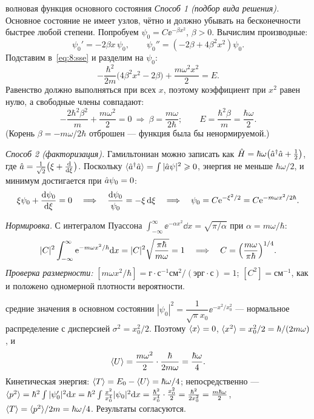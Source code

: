 \begin{derivation}[label=der:8:ground]{волновая функция основного состояния}
\emph{Способ 1 (подбор вида решения).} Основное состояние не имеет узлов, чётно и должно убывать
на бесконечности быстрее любой степени. Попробуем $\psi_0=C\ee^{-\beta x^2}$, $\beta>0$. Вычислим
производные:
\[
  \psi_0'=-2\beta x\,\psi_0,\qquad \psi_0''=(-2\beta+4\beta^2x^2)\psi_0 .
\]
Подставим в~\eqref{eq:8:sse} и разделим на $\psi_0$:
\[
  -\frac{\hbar^2}{2m}\bigl(4\beta^2x^2-2\beta\bigr)+\frac{m\omega^2x^2}{2}=E .
\]
Равенство должно выполняться при всех $x$, поэтому коэффициент при $x^2$ равен нулю, а
свободные члены совпадают:
\[
  -\frac{2\hbar^2\beta^2}{m}+\frac{m\omega^2}{2}=0\ \Rightarrow\ \beta=\frac{m\omega}{2\hbar};\qquad
  E=\frac{\hbar^2\beta}{m}=\frac{\hbar\omega}{2}.
\]
(Корень $\beta=-m\omega/2\hbar$ отброшен — функция была бы ненормируемой.)

\emph{Способ 2 (факторизация).} Гамильтониан можно записать как
$\hat{H}=\hbar\omega\bigl(\hat{a}^\dagger\hat{a}+\frac12\bigr)$, где
$\hat{a}=\frac{1}{\sqrt2}\bigl(\xi+\frac{\mathrm{d} }{\mathrm{d} \xi}\bigr)$. Поскольку $\langle\hat{a}^\dagger\hat{a}\rangle=\int|\hat{a}\psi|^2\geqslant0$,
энергия не меньше $\hbar\omega/2$, и минимум достигается при $\hat{a}\psi_0=0$:
\[
  \xi\psi_0+\frac{\mathrm{d} \psi_0}{\mathrm{d} \xi}=0\quad\Longrightarrow\quad\frac{\mathrm{d}\psi_0}{\psi_0}=-\xi\,\mathrm{d}\xi
  \quad\Longrightarrow\quad\psi_0=C\mathrm{e}^{-\xi^2/2}=C\mathrm{e}^{-m\omega x^2/2\hbar}.
\]

\emph{Нормировка.} С интегралом Пуассона $\int_{-\infty}^\infty\ee^{-\alpha x^2}\dd x=\sqrt{\pi/\alpha}$ при
$\alpha=m\omega/\hbar$:
\[
  |C|^2\int_{-\infty}^{\infty}\mathrm{e}^{-m\omega x^2/\hbar}\mathrm{d} x=|C|^2\sqrt{\frac{\pi\hbar}{m\omega}}=1
  \quad\Longrightarrow\quad C=\Bigl(\frac{m\omega}{\pi\hbar}\Bigr)^{1/4}.
\]
\emph{Проверка размерности:} $[m\omega x^2/\hbar]=\text{г}\cdot\text{с}^{-1}\text{см}^2/(\text{эрг}\cdot\text{с})=1$;
$[C^2]=\text{см}^{-1}$, как и положено одномерной плотности вероятности.
\end{derivation}

\begin{derivation}[label=der:8:means]{средние значения в основном состоянии}
$|\psi_0|^2=\dfrac{1}{\sqrt\pi x_0}\ee^{-x^2/x_0^2}$ — нормальное распределение с дисперсией $\sigma^2=x_0^2/2$.
Поэтому $\langle x\rangle=0$, $\langle x^2\rangle=x_0^2/2=\hbar/(2m\omega)$, и
\[
  \langle U\rangle=\frac{m\omega^2}{2}\cdot\frac{\hbar}{2m\omega}=\frac{\hbar\omega}{4}.
\]
Кинетическая энергия: $\langle T\rangle=E_0-\langle U\rangle=\hbar\omega/4$; непосредственно —
$\langle p^2\rangle=\hbar^2\int|\psi_0'|^2\mathrm{d} x=\hbar^2\int\frac{x^2}{x_0^4}|\psi_0|^2\mathrm{d} x=\frac{\hbar^2}{x_0^4}\cdot\frac{x_0^2}{2}=\frac{\hbar^2}{2x_0^2}=\frac{m\hbar\omega}{2}$,
$\langle T\rangle=\langle p^2\rangle/2m=\hbar\omega/4$. Результаты согласуются.
\end{derivation}

